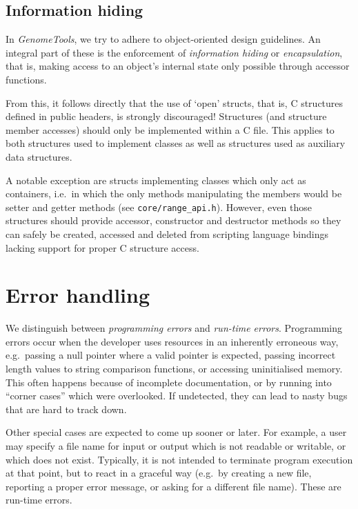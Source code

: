 \documentclass[11pt,final]{article}
\newcommand{\keyword}[1]{\lstinline{#1}}
\newcommand{\Gt}[0]{\emph{GenomeTools}\xspace}
\begin{document}
\subsection{Information hiding}
In \Gt, we try to adhere to object-oriented design guidelines. An integral
part of these is the enforcement of \emph{information hiding} or
\emph{encapsulation}, that is, making access to an object's internal state
only possible through accessor functions.

From this, it follows directly that the use of `open' structs, that is, C
structures defined in public headers, is strongly discouraged! Structures (and
structure member accesses) should only be implemented within a C file. This
applies to both structures used to implement classes as well as structures used
as auxiliary data structures.

A notable exception are structs implementing classes which only act as
containers, i.e.\ in which the only methods manipulating the members would be
setter and getter methods (see \keyword{core/range_api.h}).
However, even those structures should provide accessor, constructor and
destructor methods so they can safely be created, accessed and deleted from
scripting language bindings lacking support for proper C structure access.



\section{Error handling}
We distinguish between \emph{programming errors} and \emph{run-time errors}.
Programming errors occur when the developer uses resources in an inherently
erroneous way, e.g.\ passing a null pointer where a valid pointer is expected,
passing incorrect length values to string comparison functions, or accessing
uninitialised memory. This often happens because of incomplete documentation,
or by running into ``corner cases'' which were overlooked. If undetected, they
can lead to nasty bugs that are hard to track down.

Other special cases are expected to come up sooner or later. For example, a user
may specify a file name for input or output which is not readable or writable,
or which does not exist. Typically, it is not intended to terminate program
execution at that point, but to react in a graceful way (e.g.\ by creating a new
file, reporting a proper error message, or asking for a different file name).
These are run-time errors.
\end{document}
